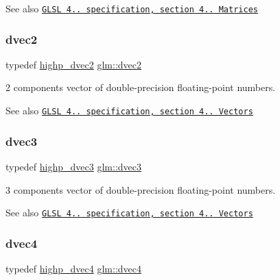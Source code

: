 \begin{DoxySeeAlso}{See also}
\href{http://www.opengl.org/registry/doc/GLSLangSpec.4.20.8.pdf}{\tt G\+L\+SL 4.. specification, section 4.. Matrices} 
\end{DoxySeeAlso}
\mbox{\label{group__core__types_gae6727259898288cae197724d5f172b3b}} 
\subsubsection{\texorpdfstring{dvec2}{dvec2}}
{\footnotesize\ttfamily typedef \hyperlink{group__core__precision_ga74ad90a083be6c50f6c285d6ab15a198}{highp\+\_\+dvec2} \hyperlink{group__core__types_gae6727259898288cae197724d5f172b3b}{glm\+::dvec2}}

2 components vector of double-\/precision floating-\/point numbers.

\begin{DoxySeeAlso}{See also}
\href{http://www.opengl.org/registry/doc/GLSLangSpec.4.20.8.pdf}{\tt G\+L\+SL 4.. specification, section 4.. Vectors} 
\end{DoxySeeAlso}
\mbox{\label{group__core__types_ga7f3287f952e6ccb481231368091702ac}} 
\subsubsection{\texorpdfstring{dvec3}{dvec3}}
{\footnotesize\ttfamily typedef \hyperlink{group__core__precision_ga54e097f7cd1f1cd46cc47eec67218bd3}{highp\+\_\+dvec3} \hyperlink{group__core__types_ga7f3287f952e6ccb481231368091702ac}{glm\+::dvec3}}

3 components vector of double-\/precision floating-\/point numbers.

\begin{DoxySeeAlso}{See also}
\href{http://www.opengl.org/registry/doc/GLSLangSpec.4.20.8.pdf}{\tt G\+L\+SL 4.. specification, section 4.. Vectors} 
\end{DoxySeeAlso}
\mbox{\label{group__core__types_ga0824ceed7ec3b2fba89765501c1540b5}} 
\subsubsection{\texorpdfstring{dvec4}{dvec4}}
{\footnotesize\ttfamily typedef \hyperlink{group__core__precision_ga2bb20b4bd180746b93577bc57f4b2b9d}{highp\+\_\+dvec4} \hyperlink{group__core__types_ga0824ceed7ec3b2fba89765501c1540b5}{glm\+::dvec4}}

